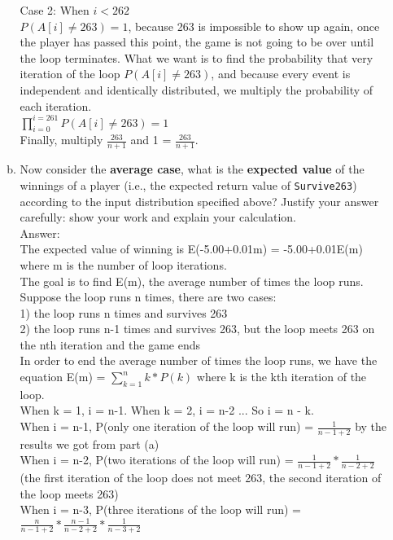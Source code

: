 \documentclass{assignment-263}
\begin{document}
\begin{enumerate}
\begin{enumerate}[(a)]
Case 2: When $i < 262$\\
                $P(A[i]\neq 263) = 1$, because 263 is impossible to show up again, once the player has passed this point, the game is not going to be over until the loop terminates. What we want is to find the probability that very iteration of the loop $P(A[i]\neq 263)$, and because every event is independent and identically distributed, we multiply the probability of each iteration.\\
				$\prod_{i=0}^{i=261} P(A[i]\neq 263) = 1$\\
				Finally, multiply $\frac{263}{n+1}$ and 1 = $\frac{263}{n+1}$.\\
			\item Now consider the \textbf{average case}, what is the
				\textbf{expected value} of the winnings of a player (i.e.,
				the expected return value of \texttt{Survive263}) according to
				the input distribution specified above? Justify your answer
				carefully: show your work and explain your calculation.\\
Answer:\\
The expected value of winning is E(-5.00+0.01m) = -5.00+0.01E(m) where m is the number of loop iterations.\\
The goal is to find E(m), the average number of times the loop runs.\\
Suppose the loop runs n times, there are two cases:\\
1) the loop runs n times and survives 263\\
2) the loop runs n-1 times and survives 263, but the loop meets 263 on the nth iteration and the game ends\\
In order to end the average number of times the loop runs, we have the equation E(m) = $\sum_{k=1}^{n} k*P(k)$ where k is the kth iteration of the loop.\\
When k = 1, i = n-1. When k = 2, i = n-2 ... So i = n - k.\\
When i = n-1, P(only one iteration of the loop will run) = $\frac{1}{n-1+2}$ by the results we got from part (a)\\
When i = n-2, P(two iterations of the loop will run) =  $\frac{1}{n-1+2}*\frac{1}{n-2+2}$\\
(the first iteration of the loop does not meet 263, the second iteration of the loop meets 263)\\
When i = n-3, P(three iterations of the loop will run) =  $\frac{n}{n-1+2}*\frac{n-1}{n-2+2}*\frac{1}{n-3+2}$\\

\end{enumerate}
\end{enumerate}
\end{document}
